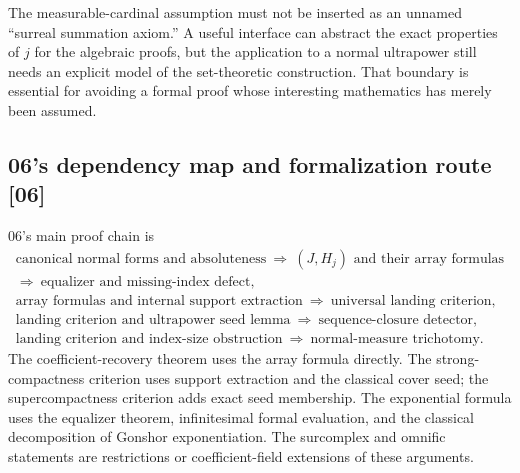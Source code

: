\documentclass[11pt,letterpaper]{article}
\numberwithin{equation}{section}
\theoremstyle{definition}
\theoremstyle{remark}
\newcommand{\src}[1]{\textup{\textsf{\small[#1]}}}%
\begin{document}
The measurable-cardinal assumption must not be inserted as an unnamed
``surreal summation axiom.'' A useful interface can abstract the exact
properties of $j$ for the algebraic proofs, but the application to a normal
ultrapower still needs an explicit model of the set-theoretic construction.
That boundary is essential for avoiding a formal proof whose interesting
mathematics has merely been assumed.

\subsection{06's dependency map and formalization route \src{06}}
06's main proof chain is
\[
 \begin{gathered}
 \text{canonical normal forms and absoluteness}
 \ \Longrightarrow\ (J,H_j)\text{ and their array formulas}\\
 \Longrightarrow\ \text{equalizer and missing-index defect},\\[3pt]
 \text{array formulas and internal support extraction}
 \ \Longrightarrow\ \text{universal landing criterion},\\
 \text{landing criterion and ultrapower seed lemma}
 \ \Longrightarrow\ \text{sequence-closure detector},\\
 \text{landing criterion and index-size obstruction}
 \ \Longrightarrow\ \text{normal-measure trichotomy}.
 \end{gathered}
\]
The coefficient-recovery theorem uses the array formula directly. The
strong-compactness criterion uses support extraction and the classical
cover seed; the supercompactness criterion adds exact seed membership. The
exponential formula uses the equalizer theorem, infinitesimal formal
evaluation, and the classical decomposition of Gonshor exponentiation. The
surcomplex and omnific statements are restrictions or coefficient-field
extensions of these arguments.
\end{document}
